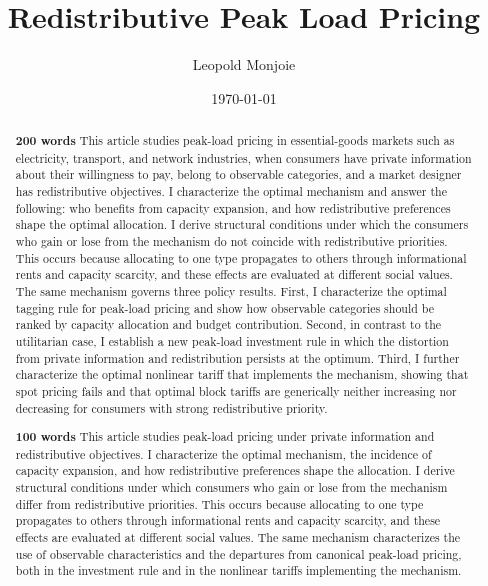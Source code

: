\documentclass{class}
\begin{document}
\begin{titlepage}

\title{Redistributive Peak Load Pricing}

\author{Leopold Monjoie}

\date{\today}
\maketitle
\begin{abstract}

\textbf{200 words} This article studies peak-load pricing in essential-goods markets such as electricity, transport, and network industries, when consumers have private information about their willingness to pay, belong to observable categories, and a market designer has redistributive objectives. I characterize the optimal mechanism and answer the following: who benefits from capacity expansion, and how redistributive preferences shape the optimal allocation. I derive structural conditions under which the consumers who gain or lose from the mechanism do not coincide with redistributive priorities. This occurs because allocating to one type propagates to others through informational rents and capacity scarcity, and these effects are evaluated at different social values. The same mechanism governs three policy results. First, I characterize the optimal tagging rule for peak-load pricing and show how observable categories should be ranked by capacity allocation and budget contribution. Second, in contrast to the utilitarian case, I establish a new peak-load investment rule in which the distortion from private information and redistribution persists at the optimum. Third, I further characterize the optimal nonlinear tariff that implements the mechanism, showing that spot pricing fails and that optimal block tariffs are generically neither increasing nor decreasing for consumers with strong redistributive priority.

\textbf{100 words} This article studies peak-load pricing under private information and redistributive objectives. I characterize the optimal mechanism, the incidence of capacity expansion, and how redistributive preferences shape the allocation. I derive structural conditions under which consumers who gain or lose from the mechanism differ from redistributive priorities. This occurs because allocating to one type propagates to others through informational rents and capacity scarcity, and these effects are evaluated at different social values. The same mechanism characterizes the use of observable characteristics and the departures from canonical peak-load pricing, both in the investment rule and in the nonlinear tariffs implementing the mechanism.





\bigskip
\end{abstract}
\setcounter{page}{0}
\thispagestyle{empty}
\end{titlepage}
\pagebreak \newpage
\end{document}
